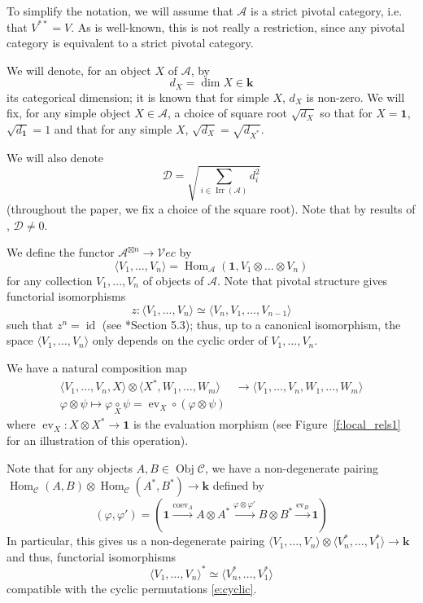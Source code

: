 \documentclass{amsart}
\theoremstyle{definition}
\theoremstyle{remark}
\numberwithin{equation}{section}
\newcommand{\firef}[1]{Figure~{\rm\ref{#1}}}
\newcommand{\cc}[1]{\underset{\scriptstyle #1}{\circ}}
\newcommand{\<}{\langle}
\renewcommand{\>}{\rangle}
\newcommand{\xxto}{\xrightarrow}              %
\newcommand{\one}{\mathbf{1}}
\newcommand{\kk}{\mathbf{k}}       %
\newcommand{\DD}{\mathcal{D}}      %
\newcommand{\C}{\mathcal{C}}      %
\newcommand{\A}{\mathcal{A}}      %
\newcommand{\Vect}{\mathcal{V}ec}  %
\newcommand{\ph}{\varphi}
\DeclareMathOperator{\Irr}{Irr}
\DeclareMathOperator{\id}{id}
\DeclareMathOperator{\Hom}{Hom}
\DeclareMathOperator{\ev}{ev} %
\DeclareMathOperator{\coev}{coev} %
\DeclareMathOperator{\Obj}{Obj}
\begin{document}
To simplify the notation, we will assume that $\A$ is a strict pivotal
category, i.e. that $V^{**}=V$. As is well-known, this is not really a
restriction, since any pivotal category is equivalent to a strict pivotal
category.


We will denote, for an object $X$ of $\A$, by
$$
d_X=\dim X\in \kk
$$
its categorical dimension; it is known that for simple $X$, $d_X$ is
non-zero. We will fix, for any simple object $X\in \A$, a choice of
square root $\sqrt{d_X}$ so that for $X=\one$, $\sqrt{d_\one}=1$ and that
for any simple $X$, $\sqrt{d_X}=\sqrt{d_{X^*}}$. 

We will also denote
\begin{equation}\label{e:DD}
\DD=\sqrt{\sum_{i\in \Irr(\A)}d_i^2}
\end{equation}
(throughout the paper, we fix a choice of the square root). Note that by
results of , $\DD\ne 0$. 



We define the functor $\A^{\boxtimes n}\to \Vect$ by
\begin{equation}\label{e:vev}
\<V_1,\dots,V_n\>=\Hom_\A(\one,
V_1\otimes\dots\otimes V_n)
\end{equation}
for any collection $V_1,\dots, V_n$ of objects of $\A$. Note that pivotal
structure gives functorial isomorphisms
\begin{equation}\label{e:cyclic}
z\colon\<V_1,\dots,V_n\>\simeq \<V_n, V_1,\dots,V_{n-1}\>
\end{equation}
such that $z^n=\id$ (see *{Section 5.3}); thus, up to a canonical
isomorphism, the space $\<V_1,\dots,V_n\>$ only depends on the cyclic order
of $V_1,\dots, V_n$.

We have a natural composition map 
\begin{equation}\label{e:composition}
\begin{aligned}
 \<V_1,\dots,V_n, X\>\otimes\<X^*, W_1,\dots,
W_m\>&\to\<V_1,\dots,V_n, W_1,\dots, W_m\>\\
\ph\otimes\psi\mapsto \ph\cc{X}\psi= \ev_X\circ (\ph\otimes\psi)
\end{aligned}
\end{equation}
where $\ev_X\colon X\otimes  X^*\to \one$ is the evaluation morphism (see
\firef{f:local_rels1} for an illustration of this operation).  

Note that for any objects $A,B\in \Obj \C$, we have a
non-degenerate pairing $\Hom_\C(A,B)\otimes \Hom_\C(A^*,B^*)\to \kk$
defined by
\begin{equation}\label{e:pairing}
(\ph, \ph')=(\one\xxto{\coev_A}A\otimes A^*\xxto{\ph\otimes \ph'}
  B\otimes B^*\xxto{\ev_B}\one)
\end{equation}
In particular, this gives us a non-degenerate pairing
$\<V_1,\dots,V_n\>\otimes \<V_n^*,\dots,V_1^*\>\to \kk$ and thus,
 functorial isomorphisms
\begin{equation}\label{e:dual}
\<V_1,\dots,V_n\>^*\simeq \<V_n^*,\dots,V_1^*\>
\end{equation}
compatible with the cyclic permutations \eqref{e:cyclic}.
\end{document}

